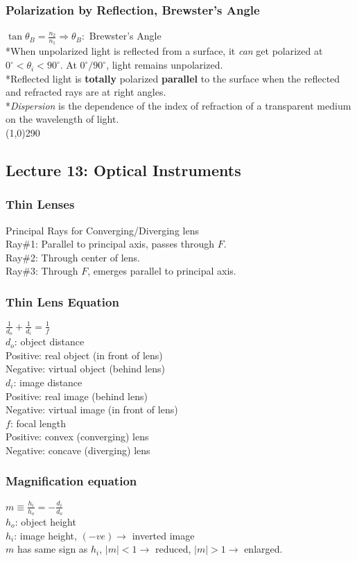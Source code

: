\documentclass[10 pt]{article}
\begin{document}
\begin{multicols}{2}
\subsubsection*{Polarization by Reflection, Brewster's Angle}
$\tan{\theta_{B}} = \frac{n_{2}}{n_{1}} \Rightarrow \theta_{B}:$ Brewster's Angle \\
*When unpolarized light is reflected from a surface, it \textit{can} get polarized at $0^{\circ} < \theta_{i}< 90^{\circ}$. At $0^{\circ}/90^{\circ}$, light remains unpolarized. \\
*Reflected light is \textbf{totally} polarized \textbf{parallel} to the surface when the reflected and refracted rays are at right angles. \\
*\textit{Dispersion} is the dependence of the index of refraction of a transparent medium on the wavelength of light.
\\
\line(1,0){290}
\subsection*{Lecture 13: Optical Instruments}
\subsubsection*{Thin Lenses}
Principal Rays for Converging/Diverging lens \\
Ray\#1: Parallel to principal axis, passes through $F$. \\
Ray\#2: Through center of lens. \\
Ray\#3: Through $F$, emerges parallel to principal axis.
\subsubsection*{Thin Lens Equation}
$\frac{1}{d_o} + \frac{1}{d_i} = \frac{1}{f}$ \\
$d_o$: object distance \\
Positive: real object (in front of lens) \\
Negative: virtual object (behind lens) \\
$d_i$: image distance \\
Positive: real image (behind lens) \\
Negative: virtual image (in front of lens) \\
$f$: focal length \\
Positive: convex (converging) lens \\
Negative: concave (diverging) lens
\subsubsection*{Magnification equation}
$m \equiv \frac{h_{i}}{h_{o}} = - \frac{d_{i}}{d_{o}}$ \\
$h_{o}$: object height \\
$h_{i}$: image height, $(-ve) \rightarrow$ inverted image \\
$m$ has same sign as $h_{i}$, $|m|<1 \rightarrow$ reduced, $|m|>1 \rightarrow$ enlarged.

\end{multicols}
\end{document}
